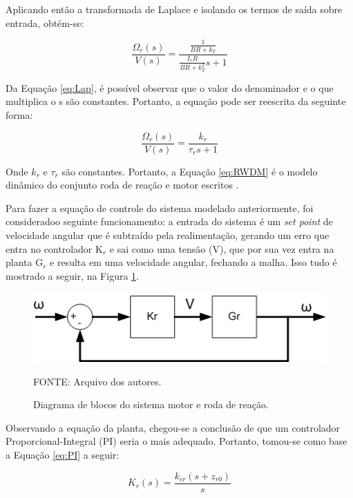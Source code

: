 \documentclass[
	12pt,				%
	openany,			%
	twoside,			%
	a4paper,			%
	english,			%
	french,				%
	spanish,			%
	brazil,				%
	oldfontcommands
	]{abntex2}
\begin{document}
Aplicando então a transformada de Laplace e isolando os termos de saída sobre entrada, obtém-se:

\begin{equation}
\frac{\Omega_{r}(s)}{V(s)} = \frac{\frac{1}{B R + k_{T}}}{\frac{I_{r} R}{B R + k_{T}^{2}} s +1}
\label{eq:Lap}
\end{equation}

Da Equação \ref{eq:Lap}, é possível observar que o valor do denominador e o que multiplica o s são constantes. Portanto, a equação pode ser reescrita da seguinte forma:

\begin{equation}
\frac{\Omega_{r}(s)}{V(s)} = \frac{k_{r}}{\tau_{r} s +1}
\label{eq:RWDM}
\end{equation}

Onde $k_{r}$ e $\tau_{r}$ são constantes. Portanto, a Equação \ref{eq:RWDM} é o modelo dinâmico do conjunto roda de reação e motor escritos \cite{Ericksson}.

Para fazer a equação de controle do sistema modelado anteriormente, foi consideradoo seguinte funcionamento: a entrada do sistema é um \textit{set point} de velocidade angular que é subtraído pela realimentação, gerando um erro que entra no controlador K$_{r}$ e sai como uma tensão (V), que por sua vez entra na planta G$_{r}$ e resulta em uma velocidade angular, fechando a malha. Isso tudo é mostrado a seguir, na Figura \ref{fig:Diagram}.

\begin{figure}[th]
	\caption{Diagrama de blocos do sistema motor e roda de reação.}
	\centering
	\includegraphics[width=0.7\linewidth]{./figs/Motor_Subsystem}
	
	\begin{small}
		FONTE: Arquivo dos autores.
	\end{small}
	\label{fig:Diagram}
\end{figure}

Observando a equação da planta, chegou-se a conclusão de que um controlador Proporcional-Integral (PI) seria o mais adequado. Portanto, tomou-se como base a Equação \ref{eq:PI} a seguir:

\begin{equation}
K_{r}(s) = \frac{k_{cr}(s+z_{r0})}{s}
\label{eq:PI}
\end{equation}
\end{document}
